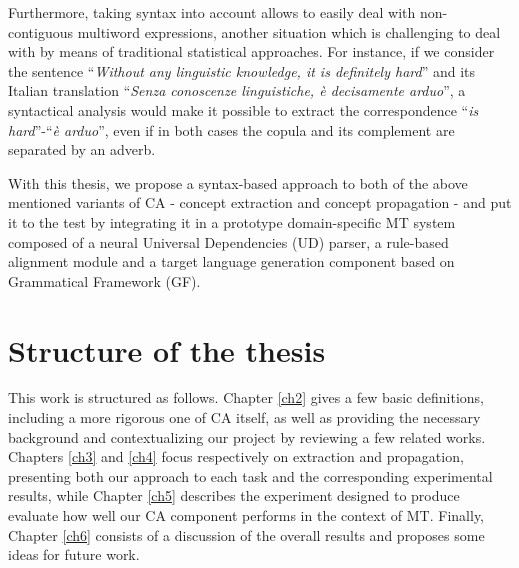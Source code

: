 Furthermore, taking syntax into account allows to easily deal with non-contiguous multiword expressions, another situation which is challenging to deal with by means of traditional statistical approaches. For instance, if we consider the sentence ``\textit{Without any linguistic knowledge, it is definitely hard}'' and its Italian translation ``\textit{Senza conoscenze linguistiche, è decisamente arduo}'', a syntactical analysis would make it possible to extract the correspondence ``\textit{is hard}''-``\textit{è arduo}'', even if in both cases the copula and its complement are separated by an adverb. \smallskip

With this thesis, we propose a syntax-based approach to both of the above mentioned variants of CA - concept extraction and concept propagation - and put it to the test by integrating it in a prototype domain-specific MT system composed of a neural Universal Dependencies (UD) parser, a rule-based alignment module and a target language generation component based on Grammatical Framework (GF).

\section*{Structure of the thesis}
This work is structured as follows. 
Chapter \ref{ch2} gives a few basic definitions, including a more rigorous one of CA itself, as well as providing the necessary background and contextualizing our project by reviewing a few related works. 
Chapters \ref{ch3} and \ref{ch4} focus respectively on extraction and propagation, presenting both our approach to each task and the corresponding experimental results, while Chapter \ref{ch5} describes the experiment designed to produce evaluate how well our CA component performs in the context of MT. 
Finally, Chapter \ref{ch6} consists of a discussion of the overall results and proposes some ideas for future work.